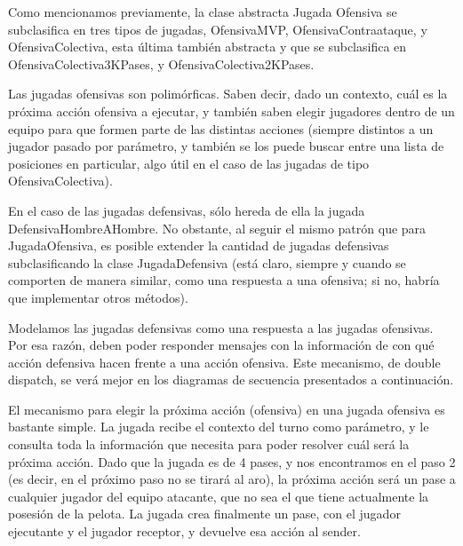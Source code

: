 Como mencionamos previamente, la clase abstracta Jugada Ofensiva se subclasifica en tres tipos de jugadas, OfensivaMVP, OfensivaContraataque, y OfensivaColectiva, esta última también abstracta y que se subclasifica en OfensivaColectiva3KPases, y OfensivaColectiva2KPases.

Las jugadas ofensivas son polimórficas. Saben decir, dado un contexto, cuál es la próxima acción ofensiva a ejecutar, y también saben elegir jugadores dentro de un equipo para que formen parte de las distintas acciones (siempre distintos a un jugador pasado por parámetro, y también se los puede buscar entre una lista de posiciones en particular, algo útil en el caso de las jugadas de tipo OfensivaColectiva).

En el caso de las jugadas defensivas, sólo hereda de ella la jugada DefensivaHombreAHombre. No obstante, al seguir el mismo patrón que para JugadaOfensiva, es posible extender la cantidad de jugadas defensivas subclasificando la clase JugadaDefensiva (está claro, siempre y cuando se comporten de manera similar, como una respuesta a una ofensiva; si no, habría que implementar otros métodos).

Modelamos las jugadas defensivas como una respuesta a las jugadas ofensivas. Por esa razón, deben poder responder mensajes con la información de con qué acción defensiva hacen frente a una acción ofensiva. Este mecanismo, de double dispatch, se verá mejor en los diagramas de secuencia presentados a continuación.

El mecanismo para elegir la próxima acción (ofensiva) en una jugada ofensiva es bastante simple. La jugada recibe el contexto del turno como parámetro, y le consulta toda la información que necesita para poder resolver cuál será la próxima acción. Dado que la jugada es de 4 pases, y nos encontramos en el paso 2 (es decir, en el próximo paso no se tirará al aro), la próxima acción será un pase a cualquier jugador del equipo atacante, que no sea el que tiene actualmente la posesión de la pelota. La jugada crea finalmente un pase, con el jugador ejecutante y el jugador receptor, y devuelve esa acción al sender.

